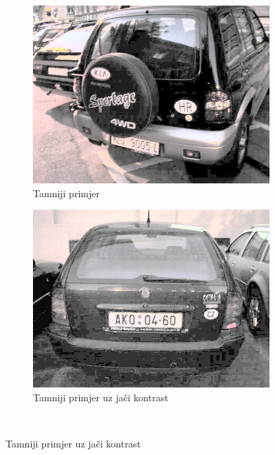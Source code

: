 \documentclass[times, utf8, diplomski]{fer}
\begin{document}
\begin{figure}[H]
     \centering
     \begin{subfigure}[b]{0.4\textwidth}
         \centering
         \includegraphics[width=\textwidth]{figures/ce_examples/1/eq.jpg}
         \caption{Tamniji primjer}
     \end{subfigure}
     \hspace{1cm}
     \begin{subfigure}[b]{0.4\textwidth}
         \centering
         \includegraphics[width=\textwidth]{figures/ce_examples/2/eq.jpg}
         \caption{Tamniji primjer uz jači kontrast}
         \label{fig:ce_eq:sum}
     \end{subfigure}\\[0.5cm]

\end{figure}
\end{document}
